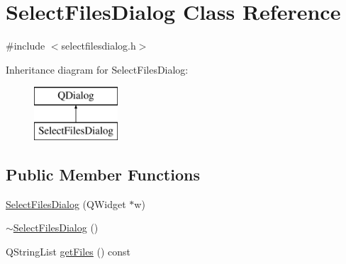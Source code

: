\hypertarget{class_select_files_dialog}{\section{Select\-Files\-Dialog Class Reference}
\label{class_select_files_dialog}
}


{\ttfamily \#include $<$selectfilesdialog.\-h$>$}

Inheritance diagram for Select\-Files\-Dialog\-:\begin{figure}[H]
\begin{center}
\leavevmode
\includegraphics[height=2.000000cm]{class_select_files_dialog}
\end{center}
\end{figure}
\subsection*{Public Member Functions}
\begin{DoxyCompactItemize}
\item 
\hyperlink{class_select_files_dialog_a9552877f65bc4aa7d9286f33757bf5bd}{Select\-Files\-Dialog} (Q\-Widget $\ast$w)
\item 
\hyperlink{class_select_files_dialog_af551040070fbcd6347bed285044c9901}{$\sim$\-Select\-Files\-Dialog} ()
\item 
Q\-String\-List \hyperlink{class_select_files_dialog_abcbd157066e682d033f5ff799af0be99}{get\-Files} () const 
\end{DoxyCompactItemize}


